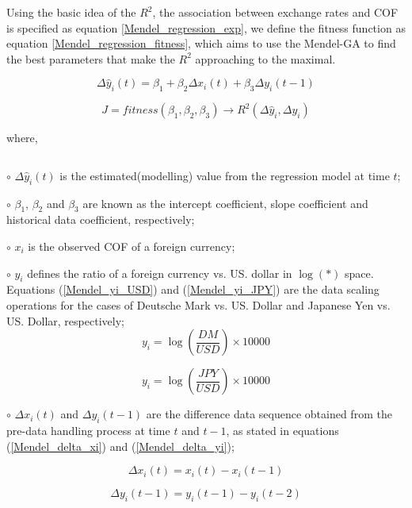 Using the basic idea of the $R^2$, the association between exchange
rates and COF is specified as equation \ref{Mendel_regression_exp},
we define the fitness function as equation
\ref{Mendel_regression_fitness}, which aims to use the Mendel-GA to
find the best parameters that make the $R^2$ approaching to the
maximal.

\begin{equation}
\Delta \hat{y}_i(t) = \beta_1 + \beta_2 \Delta x_i(t) + \beta_3
\Delta y_i(t-1)\label{Mendel_regression_exp}
\end{equation}

\begin{equation}
J = fitness(\beta_1, \beta_2, \beta_3) \rightarrow R^2(\Delta
\hat{y}_i, \Delta {y}_i) \label{Mendel_regression_fitness}
\end{equation}

where,
\begin{list}{$$}
%
\item $\circ$ $\Delta \hat{y}_i(t)$ is the estimated(modelling) value from the
regression model at time $t$;
%
\item $\circ$ $\beta_1$, $\beta_2$ and $\beta_3$ are known
as the intercept coefficient, slope coefficient and historical data
coefficient, respectively;
%
\item $\circ$ $x_i$ is the observed COF of a foreign currency;
%
\item $\circ$ $y_i$ defines the ratio of a foreign currency vs. US. dollar in
$\log(*)$ space. Equations (\ref{Mendel_yi_USD}) and
(\ref{Mendel_yi_JPY}) are the data scaling operations for the cases of Deutsche Mark vs. US. Dollar
and Japanese Yen vs. US. Dollar, respectively;
%
\begin{equation}
y_i =  \displaystyle  \log\left(\displaystyle
 \frac{DM}{USD}\right) \times 10000 \label{Mendel_yi_USD}
\end{equation}

\begin{equation}
y_i =  \displaystyle  \log\left(\displaystyle
 \frac{JPY}{USD}\right) \times 10000 \label{Mendel_yi_JPY}
\end{equation}

%
\item $\circ$ $\Delta x_i(t)$ and $\Delta y_i(t-1)$ are the difference data sequence
obtained from the pre-data handling process at time $t$ and $t-1$,
as stated in equations (\ref{Mendel_delta_xi}) and
(\ref{Mendel_delta_yi});

\begin{equation}
\Delta x_i(t) =  x_i(t) -  x_i(t-1)
\label{Mendel_delta_xi}
\end{equation}

\begin{equation}
\Delta y_i(t-1) =  y_i(t-1) -  y_i(t-2) \label{Mendel_delta_yi}
\end{equation}
%
\end{list}


